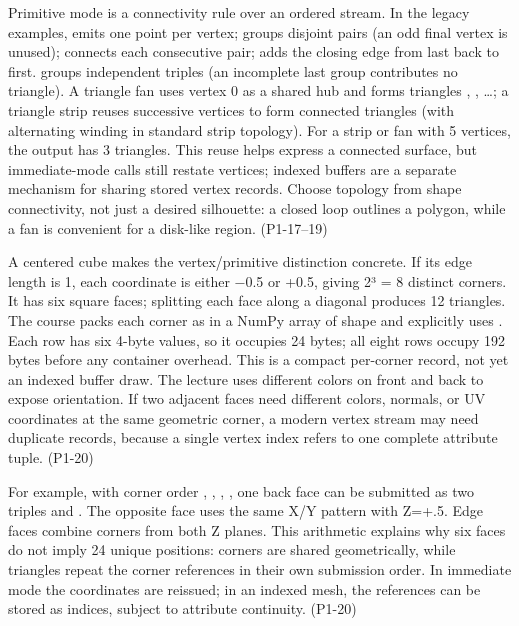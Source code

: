 Primitive mode is a connectivity rule over an ordered stream. In the legacy examples,  emits one point per vertex;  groups disjoint pairs (an odd final vertex is unused);  connects each consecutive pair;  adds the closing edge from last back to first.  groups independent triples (an incomplete last group contributes no triangle). A triangle fan uses vertex 0 as a shared hub and forms triangles , , \ldots; a triangle strip reuses successive vertices to form  connected triangles (with alternating winding in standard strip topology). For a strip or fan with 5 vertices, the output has 3 triangles. This reuse helps express a connected surface, but immediate-mode calls still restate vertices; indexed buffers are a separate mechanism for sharing stored vertex records. Choose topology from shape connectivity, not just a desired silhouette: a closed loop outlines a polygon, while a fan is convenient for a disk-like region. (P1-17--19)

A centered cube makes the vertex/primitive distinction concrete. If its edge length is 1, each coordinate is either −0.5 or +0.5, giving 2³ = 8 distinct corners. It has six square faces; splitting each face along a diagonal produces 12 triangles. The course packs each corner as  in a NumPy array of shape  and explicitly uses . Each row has six 4-byte values, so it occupies 24 bytes; all eight rows occupy 192 bytes before any container overhead. This is a compact per-corner record, not yet an indexed buffer draw. The lecture uses different colors on front and back to expose orientation. If two adjacent faces need different colors, normals, or UV coordinates at the same geometric corner, a modern vertex stream may need duplicate records, because a single vertex index refers to one complete attribute tuple. (P1-20)

For example, with corner order , , , , one back face can be submitted as two triples  and . The opposite face uses the same X/Y pattern with Z=+.5. Edge faces combine corners from both Z planes. This arithmetic explains why six faces do not imply 24 unique positions: corners are shared geometrically, while triangles repeat the corner references in their own submission order. In immediate mode the coordinates are reissued; in an indexed mesh, the references can be stored as indices, subject to attribute continuity. (P1-20)

